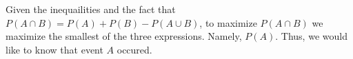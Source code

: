 Given the inequailities and the fact that $P(A \cap B) = P(A) + P(B) - P(A \cup B)$, 
to maximize $P(A \cap B)$ we maximize the smallest of the three expressions. 
Namely, $P(A)$. Thus, we would like to know that event $A$ occured.